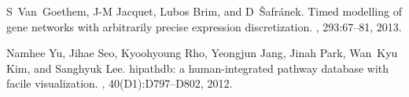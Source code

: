 \documentclass[runningheads,a4paper]{llncs}
\begin{document}
\begin{thebibliography}{10}
S~Van~Goethem, J-M Jacquet, Lubos Brim, and D~{\v{S}}afr{\'a}nek.
\newblock Timed modelling of gene networks with arbitrarily precise expression
  discretization.
, 293:67--81,
  2013.

Namhee Yu, Jihae Seo, Kyoohyoung Rho, Yeongjun Jang, Jinah Park, Wan~Kyu Kim,
  and Sanghyuk Lee.
\newblock hipathdb: a human-integrated pathway database with facile
  visualization.
, 40(D1):D797--D802, 2012.

\end{thebibliography}






\end{document}
